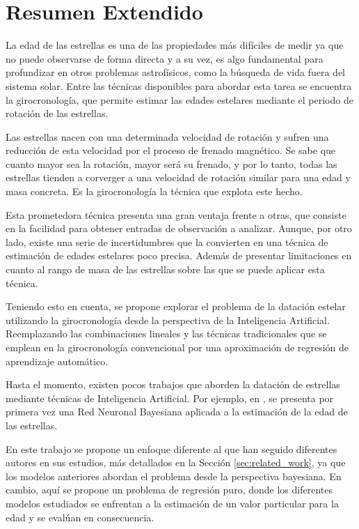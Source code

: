 \chapter{Resumen Extendido}

La edad de las estrellas es una de las propiedades más difíciles de medir ya que no puede observarse de forma directa y a su vez, es algo fundamental para profundizar en otros problemas astrofísicos, como la búsqueda de vida fuera del sistema solar. Entre las técnicas disponibles para abordar esta tarea se encuentra la girocronología, que permite estimar las edades estelares mediante el periodo de rotación de las estrellas.

Las estrellas nacen con una determinada velocidad de rotación y sufren una reducción de esta velocidad por el proceso de frenado magnético. Se sabe que cuanto mayor sea la rotación, mayor será su frenado, y por lo tanto, todas las estrellas tienden a corverger a una velocidad de rotación similar para una edad y masa concreta. Es la girocronología la técnica que explota este hecho.

Esta prometedora técnica presenta una gran ventaja frente a otras, que consiste en la facilidad para obtener entradas de observación a analizar. Aunque, por otro lado, existe una serie de incertidumbres que la convierten en una técnica de estimación de edades estelares poco precisa. Además de presentar limitaciones en cuanto al rango de masa de las estrellas sobre las que se puede aplicar esta técnica.

\vspace{0.5cm}

Teniendo esto en cuenta, se propone explorar el problema de la datación estelar utilizando la girocronología desde la perspectiva de la Inteligencia Artificial. Reemplazando las combinaciones lineales y las técnicas tradicionales que se emplean en la girocronología convencional por una aproximación de regresión de aprendizaje automático.

Hasta el momento, existen pocos trabajos que aborden la datación de estrellas mediante técnicas de Inteligencia Artificial. Por ejemplo, en \cite{sanders2018}, se presenta por primera vez una Red Neuronal Bayesiana aplicada a la estimación de la edad de las estrellas. 

En este trabajo se propone un enfoque diferente al que han seguido diferentes autores en sus estudios, más detallados en la Sección \ref{sec:related_work}, ya que los modelos anteriores abordan el problema desde la perspectiva bayesiana. En cambio, aquí se propone un problema de regresión puro, donde los diferentes modelos estudiados se enfrentan a la estimación de un valor particular para la edad y se evalúan en consecuencia.

